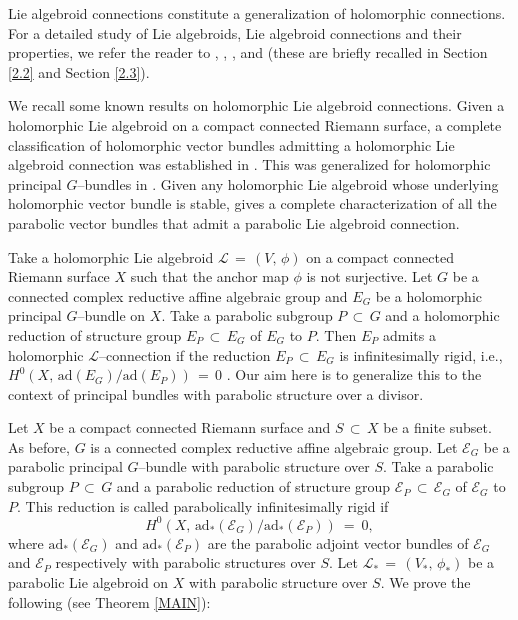 \documentclass[12pt, reqno]{amsart}
\numberwithin{equation}{section}
\newcommand{\ad}{\textrm{ad}}
\begin{document}
Lie algebroid connections constitute a generalization of holomorphic connections. For a detailed study of Lie 
algebroids, Lie algebroid connections and their properties, we refer the reader to \cite{AO}, \cite{BMRT}, 
\cite{BR}, \cite{To1} and \cite{To2} (these are briefly recalled in Section \ref{2.2} and Section \ref{2.3}).

We recall some known results on holomorphic Lie algebroid connections.
Given a holomorphic Lie algebroid on a compact connected Riemann surface, a complete classification
of holomorphic vector bundles admitting a holomorphic Lie algebroid connection was established
in \cite{ABKS1}. This was generalized for holomorphic principal $G$--bundles in \cite{Bi1}.
Given any holomorphic Lie algebroid whose underlying holomorphic vector bundle is stable,
\cite{ABKS} gives a complete characterization of
all the parabolic vector bundles that admit a parabolic Lie algebroid connection.

Take a holomorphic Lie algebroid $\mathcal{L}\,=\, (V,\, \phi)$ on a compact connected Riemann surface $X$ 
such that the anchor map $\phi$ is not surjective. Let $G$ be a connected complex reductive affine algebraic 
group and $E_{G}$ be a holomorphic principal $G$--bundle on $X$. Take a parabolic subgroup $P\, \subset\,G$ 
and a holomorphic reduction of structure group $E_{P}\,\subset\, E_{G}$ of $E_{G}$ to $P$. Then $E_{P}$ admits 
a holomorphic $\mathcal{L}$--connection if the reduction $E_{P}\,\subset\, E_{G}$ is infinitesimally rigid, 
i.e., $H^{0}(X,\, \ad(E_{G})/\ad(E_{P}))\,=\,0$ \cite{BBK}. Our aim here is to generalize this to the context 
of principal bundles with parabolic structure over a divisor.
 
Let $X$ be a compact connected Riemann surface and $S\,\subset\, X$ be a finite subset.
As before, $G$ is a connected complex reductive affine algebraic group. Let
$\mathcal{E}_{G}$ be a parabolic principal $G$--bundle with parabolic structure over $S$. Take
a parabolic subgroup $P\, \subset\, G$ and a parabolic reduction of structure group 
$\mathcal{E}_{P}\, \subset\, \mathcal{E}_{G}$ of $\mathcal{E}_{G}$ to $P$. This reduction is
called parabolically infinitesimally rigid if
$$H^{0}(X,\,\ad_{*}(\mathcal{E}_{G})/\ad_{*}(\mathcal{E}_{P}))\ =\ 0,$$
where $\ad_{*}(\mathcal{E}_{G})$ and $\ad_{*}(\mathcal{E}_{P})$ are the parabolic adjoint vector bundles of
$\mathcal{E}_{G}$ and $\mathcal{E}_{P}$ respectively with parabolic structures over $S$.
Let $\mathcal{L}_{*}\,=\, (V_{*},\,\phi_{*})$ be a parabolic Lie algebroid on $X$ with
parabolic structure over $S$.
We prove the following (see Theorem \ref{MAIN}):
\end{document}

